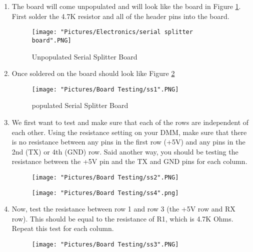 \documentclass[12pt]{article}
\begin{document}
\begin{enumerate}
	\item The board will come unpopulated and will look like the board in Figure \ref{ss}. First solder the 4.7K resistor and all of the header pins into 		the board. 

	\begin{figure}[H]
	  	\centering
	    	\texttt{[image: "Pictures/Electronics/serial splitter board".PNG]}
		\caption{Unpopulated Serial Splitter Board}
		\label{ss}
	\end{figure}

	\item Once soldered on the board should look like Figure \ref{ss1}

	\begin{figure}[H]
	  	\centering
	    	\texttt{[image: "Pictures/Board Testing/ss1".PNG]}
		\caption{populated Serial Splitter Board}
		\label{ss1}
	\end{figure}

	\item We first want to test and make sure that each of the rows are independent of each other. Using the resistance setting on your DMM, make sure that there is no resistance between any pins in the first row (+5V) and any pins in the 2nd (TX) or 4th (GND) row.  Said another way, you should be testing the resistance between the +5V pin and the TX and GND pins for each column. 

	\begin{figure}[H]
	 	\centering
	  	\begin{minipage}[b]{0.45\textwidth}
			\texttt{[image: "Pictures/Board Testing/ss2".PNG]}
	  	\end{minipage}
	  	\hfill
	  	\begin{minipage}[b]{0.45\textwidth}
	    		\texttt{[image: "Pictures/Board Testing/ss4".png]}
	  	\end{minipage}
		\label{sstest1}
	\end{figure}

	\item Now, test the resistance between row 1 and row 3 (the +5V row and RX row). This should be equal to the resistance of R1, which is 4.7K Ohms. Repeat this test for each column.

	\begin{figure}[H]
	  	\centering
	    	\texttt{[image: "Pictures/Board Testing/ss3".PNG]}
		\label{ss3}
	\end{figure}
	

\end{enumerate}
\end{document}
